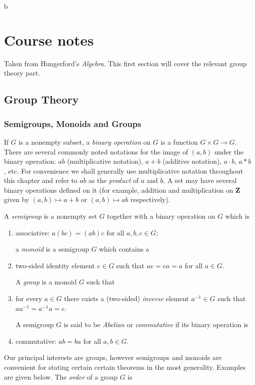 b\chapter{Course notes}
Taken from Hungerford's \emph{Algebra}. This first section will cover the
relevant group theory part.
\section{Group Theory}
\subsection{Semigroups, Monoids and Groups}
If $G$ is a nonempty subset, a \emph{binary operation} on $G$ is a function
$G\times G\to G$. There are several commonly noted notations for the image
of $(a,b)$ under the binary operation: $ab$ (multiplicative notation),
$a+b$ (additive notation), $a\cdot b$, $a*b$, etc. For convenience we shall
generally use multiplicative notation throughout this chapter and refer to
$ab$ as the \emph{product} of $a$ and $b$. A set may have several binary
operations defined on it (for example, addition and multiplication on
$\mathbf{Z}$ given by $(a,b)\mapsto a+b$ or $(a,b)\mapsto ab$ respectively).
\begin{definition}
A \emph{semigroup} is a nonempty set $G$ together with a binary operation
on $G$ which is
\begin{enumerate}[label=\textnormal{(\alph*)}]
\item associative: $a(bc)=(ab)c$ for all $a,b,c\in G$;

  \bigskip
  a \emph{monoid}  is a semigroup $G$ which contains a
\item two-sided identity element $e\in G$ such that $ae=ea=a$ for all $a\in
  G$.

  \bigskip
  A \emph{group} is a monoid $G$ such that
\item for every $a\in G$ there exists a (two-sided) \emph{inverse} element
  $a^{-1}\in G$ such that $aa^{-1}=a^{-1}a=e$.

  \bigskip
  A semigroup $G$ is said to be \emph{Abelian} or \emph{commutative} if its
  binary operation is
\item commutative: $ab=ba$ for all $a,b\in G$.
\end{enumerate}
\end{definition}
Our principal interests are groups, however semigroups and monoids are
convenient for stating certain certain theorems in the most
generality. Examples are given below. The \emph{order} of a group $G$ is
